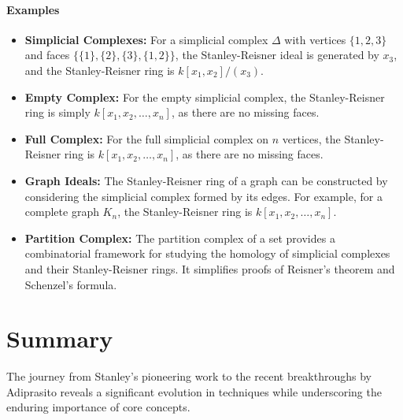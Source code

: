 \documentclass[12pt]{article}
\theoremstyle{definition}
\numberwithin{equation}{subsection}
\begin{document}
\paragraph{Examples}
\begin{itemize}
\item \textbf{Simplicial Complexes:} For a simplicial complex $\Delta$ with vertices $\{1, 2, 3\}$ and faces $\{\{1\}, \{2\}, \{3\}, \{1, 2\}\}$, the Stanley-Reisner ideal is generated by $x_3$, and the Stanley-Reisner ring is $k[x_1, x_2]/(x_3)$.
\item \textbf{Empty Complex:} For the empty simplicial complex, the Stanley-Reisner ring is simply $k[x_1, x_2, \ldots, x_n]$, as there are no missing faces.
\item \textbf{Full Complex:} For the full simplicial complex on $n$ vertices, the Stanley-Reisner ring is $k[x_1, x_2, \ldots, x_n]$, as there are no missing faces.
\item \textbf{Graph Ideals:} The Stanley-Reisner ring of a graph can be constructed by considering the simplicial complex formed by its edges. For example, for a complete graph $K_n$, the Stanley-Reisner ring is $k[x_1, x_2, \ldots, x_n]$.
\item \textbf{Partition Complex:} The partition complex of a set provides a combinatorial framework for studying the homology of simplicial complexes and their Stanley-Reisner rings. It simplifies proofs of Reisner's theorem and Schenzel's formula.
\end{itemize}

\section*{Summary}
The journey from Stanley's pioneering work to the recent breakthroughs by Adiprasito reveals a significant evolution in techniques while underscoring the enduring importance of core concepts.
\end{document}
